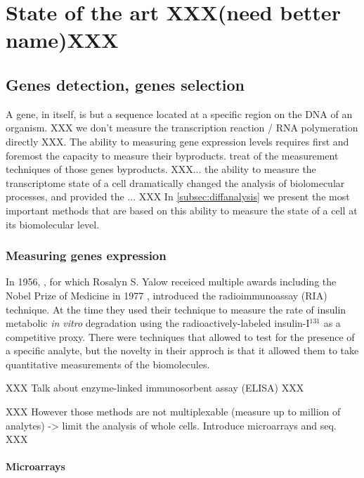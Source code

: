 \chapter{State of the art  XXX(need better name)XXX}
\label{chap:state}

\section{Genes detection, genes selection}

	A gene, in itself, is but a sequence located at a specific region on the DNA of an organism.
	XXX we don't measure the transcription reaction / RNA polymeration directly XXX.
	The ability to measuring gene expression levels requires first and foremost the capacity to measure their byproducts.
	 treat of the measurement techniques of those genes byproducts.
	XXX... the ability to measure the transcriptome state of a cell dramatically changed the analysis of biolomecular processes, and provided the ... XXX
	In \cref{subsec:diffanalysis} we present the most important methods that are based on this ability to measure the state of a cell at its biomolecular level.

	\subsection{Measuring genes expression}
	\label{subsec:measuregenes}

	In 1956, \textcite{berson1956insulin}, for which Rosalyn S. Yalow receiced multiple awards including the Nobel Prize of Medicine in 1977 \parencite{SJI:SJI21}, introduced the radioimmunoassay (RIA) technique.
	At the time they used their technique to measure the rate of insulin metabolic \emph{in vitro} degradation using the radioactively-labeled insulin-I$^{131}$ as a competitive proxy.
	There were techniques that allowed to test for the presence of a specific analyte, but the novelty in their approch is that it allowed them to take quantitative measurements of the biomolecules.

	XXX Talk about enzyme-linked immunosorbent assay (ELISA) XXX

	XXX However those methods are not multiplexable (measure up to million of analytes) -> limit the analysis of whole cells.
	Introduce microarrays and seq. XXX

	\subsubsection{Microarrays}

